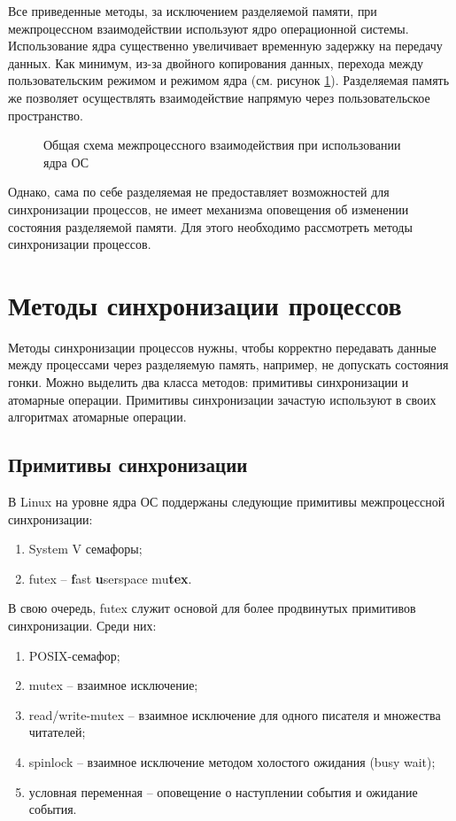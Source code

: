 Все приведенные методы, за исключением разделяемой памяти, при межпроцессном взаимодействии используют ядро операционной системы. Использование ядра существенно увеличивает временную задержку на передачу данных. Как минимум, из-за двойного копирования данных, перехода между пользовательским режимом и режимом ядра (см. рисунок \ref{chapter11:KernelUsage}).
Разделяемая память же позволяет осуществлять взаимодействие напрямую через пользовательское пространство.

\begin{figure}[!h]
\caption{Общая схема межпроцессного взаимодействия при использовании ядра ОС}
\label{chapter11:KernelUsage}
\end{figure}

Однако, сама по себе разделяемая не предоставляет возможностей для синхронизации процессов, не имеет механизма оповещения об изменении состояния разделяемой памяти. Для этого необходимо рассмотреть методы синхронизации процессов.

\section{Методы синхронизации процессов}

Методы синхронизации процессов нужны, чтобы корректно передавать данные между процессами через разделяемую память, например, не допускать состояния гонки. Можно выделить два класса методов: примитивы синхронизации и атомарные операции. Примитивы синхронизации зачастую используют в своих алгоритмах атомарные операции.

\subsection{Примитивы синхронизации}

В Linux на уровне ядра ОС поддержаны следующие примитивы межпроцессной синхронизации:
\begin{enumerate}
\item System V семафоры;
\item futex -- \textbf{f}ast \textbf{u}serspace mu\textbf{tex}.
\end{enumerate}

В свою очередь, futex служит основой для более продвинутых примитивов синхронизации. Среди них:
\begin{enumerate}
\item POSIX-семафор;
\item mutex -- взаимное исключение;
\item read/write-mutex -- взаимное исключение для одного писателя и множества читателей;
\item spinlock -- взаимное исключение методом холостого ожидания (busy wait);
\item условная переменная -- оповещение о наступлении события и ожидание события.
\end{enumerate}

